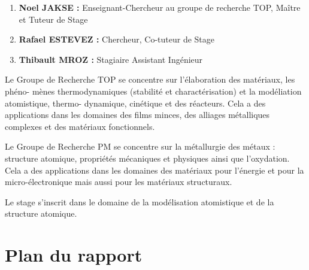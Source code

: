         \begin{enumerate}[\hspace{3em}$\bullet$]
            \item \textbf{Noel JAKSE : }Enseignant-Chercheur au groupe de recherche TOP, Maître et Tuteur de Stage
            \item \textbf{Rafael ESTEVEZ : }Chercheur, Co-tuteur de Stage
            \item \textbf{Thibault MROZ : }Stagiaire Assistant Ingénieur
        \end{enumerate}

        Le Groupe de Recherche TOP se concentre sur l'élaboration des matériaux, les phéno-
        mènes thermodynamiques (stabilité et charactérisation) et la modéliation atomistique, thermo-
        dynamique, cinétique et des réacteurs. Cela a des applications dans les domaines des films minces, des alliages métalliques complexes et des matériaux fonctionnels.

        Le Groupe de Recherche PM se concentre sur la métallurgie des métaux : structure atomique, propriétés mécaniques et physiques ainsi que l'oxydation. Cela a des applications dans les domaines des matériaux pour l'énergie et pour la micro-électronique mais aussi pour les matériaux structuraux. 

        Le stage s'inscrit dans le domaine de la modélisation atomistique et de la structure atomique. 

\section{Plan du rapport}
        
